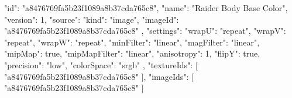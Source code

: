 {
  "id": "a8476769fa5b23f1089a8b37cda765c8",
  "name": "Raider Body Base Color",
  "version": 1,
  "source": {
    "kind": "image",
    "imageId": "a8476769fa5b23f1089a8b37cda765c8"
  },
  "settings": {
    "wrapU": "repeat",
    "wrapV": "repeat",
    "wrapW": "repeat",
    "minFilter": "linear",
    "magFilter": "linear",
    "mipMap": true,
    "mipMapFilter": "linear",
    "anisotropy": 1,
    "flipY": true,
    "precision": "low",
    "colorSpace": "srgb"
  },
  "textureIds": [
    "a8476769fa5b23f1089a8b37cda765c8"
  ],
  "imageIds": [
    "a8476769fa5b23f1089a8b37cda765c8"
  ]
}
